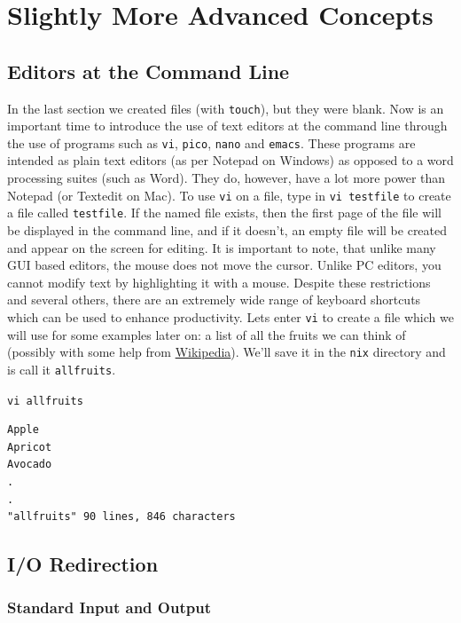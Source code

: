 \documentclass[11pt]{article}
\begin{document}
\section{Slightly More Advanced Concepts}

\subsection{Editors at the Command Line}

In the last section we created files (with \texttt{touch}), but they were blank. Now is an important time to introduce the use of text editors at the command line through the use of programs such as \texttt{vi}, \texttt{pico}, \texttt{nano} and \texttt{emacs}. These programs are intended as plain text editors (as per Notepad on Windows) as opposed to a word processing suites (such as Word). They do, however, have a lot more power than Notepad (or Textedit on Mac). To use \texttt{vi} on a file, type in \texttt{vi testfile} to create a file called \texttt{testfile}. If the named file exists, then the first page of the file will be displayed in the command line, and if it doesn't, an empty file will be created and appear on the screen for editing. It is important to note, that unlike many GUI based editors, the mouse does not move the cursor. Unlike PC editors, you cannot modify text by highlighting it with a mouse. Despite these restrictions and several others, there are an extremely wide range of keyboard shortcuts which can be used to enhance productivity. Lets enter \texttt{vi} to create a file which we will use for some examples later on: a list of all the fruits we can think of (possibly with some help from \href{https://simple.wikipedia.org/wiki/List_of_fruits}{Wikipedia}). We'll save it in the \texttt{nix} directory and is call it \texttt{allfruits}.

\begin{listing}[H]
\caption{\texttt{vi allfruits}}\vspace{-0.1in}
\begin{verbatim}
Apple
Apricot
Avocado
.
.
"allfruits" 90 lines, 846 characters
\end{verbatim}
\end{listing}
 
\subsection{I/O Redirection}
\subsubsection{Standard Input and Output}
\end{document}
